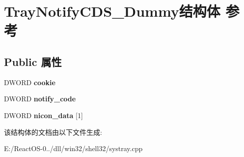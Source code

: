 \hypertarget{struct_tray_notify_c_d_s___dummy}{}\section{Tray\+Notify\+C\+D\+S\+\_\+\+Dummy结构体 参考}
\label{struct_tray_notify_c_d_s___dummy}
\subsection*{Public 属性}
\begin{DoxyCompactItemize}
\item 
\mbox{\label{struct_tray_notify_c_d_s___dummy_ae5024a186896a906d7ec51d3b6f47230}} 
D\+W\+O\+RD {\bfseries cookie}
\item 
\mbox{\label{struct_tray_notify_c_d_s___dummy_a5e1c17c7b5423f3b789c194b5897becb}} 
D\+W\+O\+RD {\bfseries notify\+\_\+code}
\item 
\mbox{\label{struct_tray_notify_c_d_s___dummy_aa3dea17d5027d26a85dafe598863ffc1}} 
D\+W\+O\+RD {\bfseries nicon\+\_\+data} \mbox{[}1\mbox{]}
\end{DoxyCompactItemize}


该结构体的文档由以下文件生成\+:\begin{DoxyCompactItemize}
\item 
E\+:/\+React\+O\+S-\/0../dll/win32/shell32/systray.\+cpp\end{DoxyCompactItemize}
